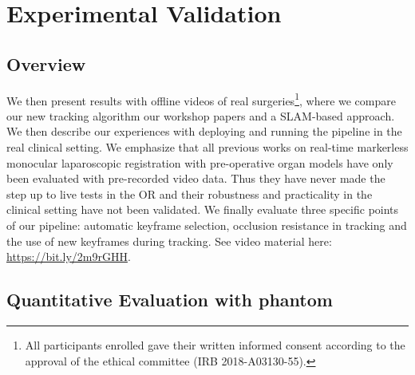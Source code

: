 \section{Experimental Validation}
\label{sec:experiments}
\subsection{Overview}
We then present results with offline videos of real surgeries\footnote{All participants enrolled gave their written informed consent according to the approval of the ethical committee (IRB 2018-A03130-55).}, where we compare our new tracking algorithm \wrt our workshop papers and a SLAM-based approach. We then describe our experiences with deploying and running the pipeline in the real clinical setting.
We emphasize that all previous works on real-time markerless monocular laparoscopic registration with pre-operative organ models have only been evaluated with pre-recorded video data.
Thus they have never made the step up to live tests in the OR and their robustness and practicality in the clinical setting have not been validated.
We finally evaluate three specific points of our pipeline: automatic keyframe selection, occlusion resistance in tracking and the use of new keyframes during tracking.
See video material here: \url{https://bit.ly/2m9rGHH}.

\subsection{Quantitative Evaluation with phantom}
\label{subsec:quantitative-evaluation-with-phantom}

